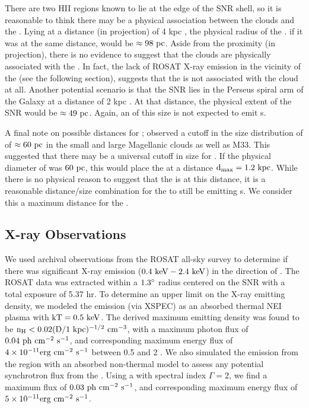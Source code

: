 There are two HII regions known to lie at the edge of the SNR shell,  so it is reasonable to think there may be a physical association between the clouds and the \snr{}. Lying at a distance (in projection) of 4 kpc \citep{Gao14}, the physical radius of the \snr{}. if it was at the same distance, would be  ${\rm \approx 98~pc}$. Aside from the proximity (in projection), there is no evidence to suggest that the clouds are physically associated with the \snr{}. In fact, the lack of ROSAT X-ray emission in the vicinity of the \Gone{} (see the following section), suggests that the \snr{} is not associated with the cloud at all. Another potential scenario is that the SNR lies in the Perseus spiral arm of the Galaxy at a distance of 2 kpc \citep{Xu06}. At that distance, the physical extent of the SNR would be ${\rm \approx 49~pc}$. Again, an \snr{} of this size is not expected to emit  \gam{}s.

A final note on possible distances for \Gone{}; \cite{Badenes10}  observed a cutoff in the size distribution of \snrs{} of ${\rm \approx 60~pc}$ in the small and large Magellanic clouds as well as M33. This suggested that there may be a universal cutoff in size for \snrs{}. If the physical diameter of \Gone{} was ${\rm 60~pc}$, this would place the \snr{} at a distance ${\rm d_{max} = 1.2~kpc}$. While there is no physical reason to suggest that the \snr{} is at this distance, it is a reasonable distance/size combination for the \snr{} to still be emitting \gam{}s.  We consider this a maximum distance for the \snr{}.

\subsection{X-ray Observations}\label{G150:Xray}

We used archival observations from the ROSAT all-sky survey \citep{Voges99} to determine if there was significant X-ray emission (${\rm 0.4 ~\mathrm{keV}{} - 2.4 ~\mathrm{keV}{}}$) in the direction of \Gone{}. The ROSAT data was extracted within a ${\rm 1.3^\circ}$ radius centered on the SNR with a total exposure of 5.37 hr. To determine an upper limit on the X-ray emitting density, we modeled the emission (via XSPEC) as an absorbed thermal NEI plasma with ${\rm kT=0.5 ~\mathrm{keV}{}}$. The derived maximum emitting density was found to be ${\rm n_H < 0.02 (D / 1~kpc)^{-1/2}~cm^{-3}}$, with a maximum photon flux  of ${\rm 0.04~ph~cm^{-2}~s^{-1}}$,  and corresponding maximum energy flux of ${\rm 4\times 10^{-11} erg~cm^{-2}~s^{-1}}$ between 0.5 and 2 \kev{} . We also simulated the emission from the region with an absorbed non-thermal \pl{} model to assess any potential synchrotron flux from the \snr{}. Using a \pl{} with spectral index $\Gamma = 2$, we find a maximum flux of ${\rm 0.03~ph~cm^{-2}~s^{-1}}$, and corresponding maximum energy flux of ${\rm 5\times 10^{-11} erg~cm^{-2}~s^{-1}}$. 

